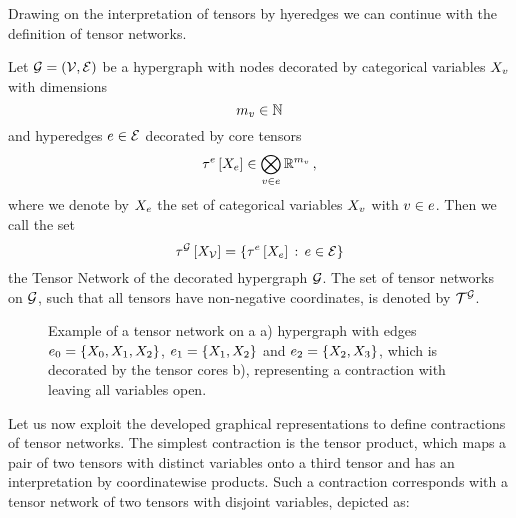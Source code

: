 Drawing on the interpretation of tensors by hyeredges we can continue with the definition of tensor networks.

\begin{definition}\label{def:tensorNetwork}
	Let $\mathcal{G}=(\mathcal{V},\mathcal{E})$ be a hypergraph with nodes decorated by categorical variables $X_{v}$ with dimensions
		\[ m_{v} \in \mathbb{N} \]
	and hyperedges $e\in\mathcal{E}$ decorated by core tensors
		\[ \tau^{e}\left[X_{e}\right] \in \bigotimes_{v\in e}\mathbb{R}^{m_{v}} \, , \]
	where we denote by $X_{e}$ the set of categorical variables $X_{v}$ with $v\in e$.
	Then we call the set
		\[ \tau^{\mathcal{G}}\left[X_{\mathcal{V}}\right] = \{\tau^{e}\left[X_{e}\right]  \,:\, e\in\mathcal{E}\} \]
	the Tensor Network of the decorated hypergraph $\mathcal{G}$.
	The set of tensor networks on $\mathcal{G}$, such that all tensors have non-negative coordinates, is denoted by $\mathcal{T}^{\mathcal{G}}$.
\end{definition}


\begin{figure}
	\begin{center}
		
	\end{center}
	\caption{
	Example of a tensor network on a
	a) hypergraph with edges $e_0=\{X_{0},X_{1},X_{2}\}$, $e_1=\{X_{1},X_{2}\}$ and $e_2=\{X_{2},X_{3}\}$,
	which is decorated by the tensor cores b), representing a contraction with leaving all variables open.
	}\label{fig:network}
\end{figure}






Let us now exploit the developed graphical representations to define contractions of tensor networks.
The simplest contraction is the tensor product, which maps a pair of two tensors with distinct variables onto a third tensor and has an interpretation by coordinatewise products.
Such a contraction corresponds with a tensor network of two tensors with disjoint variables, depicted as:
\begin{center}
	
\end{center}

